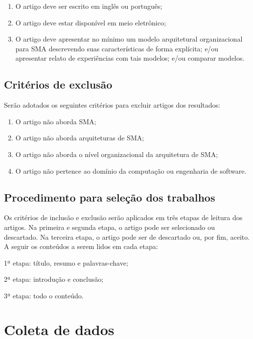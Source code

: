 \begin{enumerate}
    \item O artigo deve ser escrito em inglês ou português;
    \item O artigo deve estar disponível em meio eletrônico;
    \item O artigo deve apresentar no mínimo um modelo arquitetural organizacional para SMA descrevendo suas características de forma explícita; e/ou apresentar relato de experiências com tais modelos; e/ou comparar modelos.
\end{enumerate}

\subsection{Critérios de exclusão}

Serão adotados os seguintes critérios para excluir artigos dos resultados:

\begin{enumerate}
    \item O artigo não aborda SMA;
    \item O artigo não aborda arquiteturas de SMA;
    \item O artigo não aborda o nível organizacional da arquitetura de SMA;
    \item O artigo não pertence ao domínio da computação ou engenharia de software.
\end{enumerate}

\subsection{Procedimento para seleção dos trabalhos}

Os critérios de inclusão e exclusão serão aplicados em três etapas de leitura dos artigos. Na primeira e segunda etapa, o artigo pode ser selecionado ou descartado. Na terceira etapa, o artigo pode ser de descartado ou, por fim, aceito. A seguir os conteúdos a serem lidos em cada etapa:

\par 1ª etapa: título, resumo e palavras-chave;
\par 2ª etapa: introdução e conclusão;
\par 3ª etapa: todo o conteúdo.

\section{Coleta de dados}

